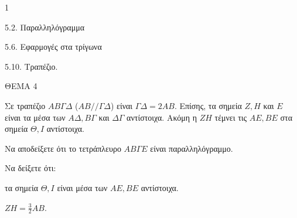 \begin{ylh}{1}
    \item 5.2. Παραλληλόγραμμα
    \item 5.6. Εφαρμογές στα τρίγωνα
    \item 5.10. Τραπέζιο.
\end{ylh}

ΘΕΜΑ 4

Σε τραπέζιο $ΑΒ\Gamma\Delta$ ($ΑΒ//\Gamma\Delta$) είναι $\Gamma\Delta = 2ΑΒ$. Επίσης, τα σημεία $Ζ, Η$ και $E$ είναι τα μέσα των $Α\Delta, Β\Gamma$ και $\Delta\Gamma$ αντίστοιχα. Ακόμη η $ΖΗ$ τέμνει τις $AE, BE$ στα σημεία $\Theta, Ι$ αντίστοιχα.

\begin{alist}
\item Να αποδείξετε ότι το τετράπλευρο $ΑΒ\Gamma E$ είναι παραλληλόγραμμο. 
\item Να δείξετε ότι:
\begin{alist}
\item τα σημεία $\Theta, Ι$ είναι μέσα των $AE, BE$ αντίστοιχα. 
\item $ΖΗ = \frac{3}{2}ΑΒ$. 
\end{alist}

\begin{center}
\end{center}
\end{alist}
